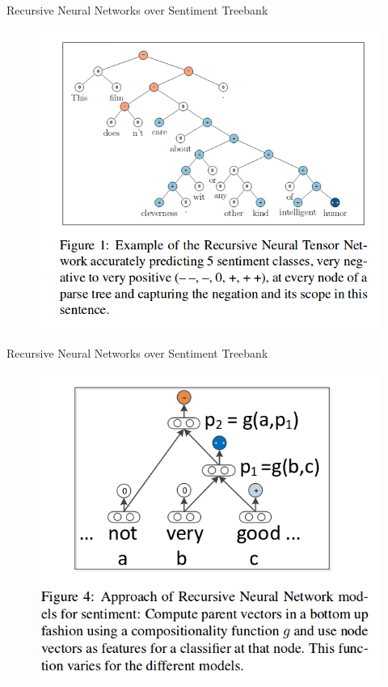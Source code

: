 \documentclass[handout]{beamer}
\begin{document}
\begin{frame}{Recursive Neural Networks over Sentiment Treebank}
   
    \begin{figure}[h]
        	\includegraphics[scale = 0.45]{pics/recTensor1.png}
        \end{figure}       
        
\end{frame}


\begin{frame}{Recursive Neural Networks over Sentiment Treebank}
   
    \begin{figure}[h]
        	\includegraphics[scale = 0.45]{pics/recTensor2.png}
        \end{figure}       
        
\end{frame}
\end{document}
